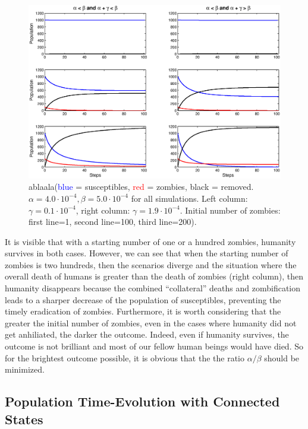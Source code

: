 \documentclass[11pt]{article} %
\begin{document}
\begin{figure}[h!]
\centerline{
\includegraphics[scale=0.55]{../images/Matlab_figures/model-AltB.eps}}
\caption{ablaala(\textcolor{blue}{blue} = susceptibles, \textcolor{red}{red} = zombies, black = removed. $\alpha=4.0\cdot10^{-4}, \beta=5.0\cdot10^{-4}$ for all simulations. Left column: $\gamma=0.1\cdot10^{-4}$, right column: $\gamma=1.9\cdot10^{-4}$. Initial number of zombies: first line=1, second line=100, third line=200). \label{gamma_population} }
\end{figure}

It is visible that with a starting number of one or a hundred zombies, humanity survives in both cases. However, we can see that when the starting number of zombies is two hundreds, then the scenarios diverge and the situation where the overall death of humans is greater than the death of zombies (right column), then humanity disappears because the combined ``collateral''  deaths and zombification leads to a sharper decrease of the population of susceptibles, preventing the timely eradication of zombies. Furthermore, it is worth considering that the greater the initial number of zombies, even in the cases where humanity did not get anhiliated, the darker the outcome. Indeed, even if humanity survives, the outcome is not brilliant and most of our fellow human beings would have died. So for the brightest outcome possible, it is obvious that the the ratio $\alpha/\beta$ should be minimized.


\subsection{Population Time-Evolution with Connected States}\indent
\label{sec:time-evolv}
 
\end{document}
